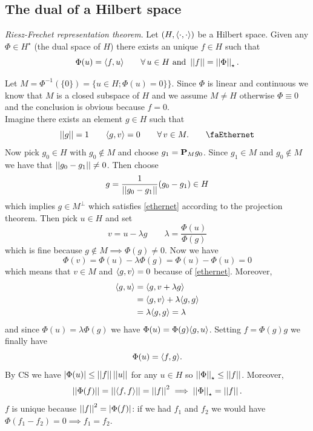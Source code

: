 \documentclass{article}
\begin{document}
\subsection{The dual of a Hilbert space}
\begin{theorem}
	\emph{Riesz-Frechet representation theorem}. Let $\left(H,\langle \cdot,\cdot \rangle\right)$ be a Hilbert space. Given any $\Phi\in H^{\star}$ (the dual space of $H$) there exists an unique $f\in H$ such that
	\begin{equation*}
		\Phi(u)=\langle f,u \rangle\qquad\forall\, u\in H\text{ and }\left|\left|f\right|\right|=\left|\left|\Phi\right|\right|_{\star}.
	\end{equation*}
\end{theorem}
\begin{fancyproof}
	Let $M=\Phi^{-1}(\{0\})=\{u\in H;\Phi(u)=0\}\}$. Since $\Phi$ is linear and continuous we know that $M$ is a closed subspace of $H$ and we assume $M\neq H$ otherwise $\Phi\equiv0$ and the conclusion is obvious because $f=0$.\\
	Imagine there exists an element $g\in H$ such that
	\begin{equation*}
		\norm{g}=1\qquad\inprod{g,v}=0\qquad\every v\in M.\tag*{\faEthernet}\label{ethernet}
	\end{equation*}
	Now pick $g_{0}\in H$ with $g_{0}\notin M$ and choose $g_{1}=\mathbf{P}_{M}g_{0}$. Since $g_{1}\in M$ and $g_{0}\notin M$ we have that $\left|\left|g_{0}-g_{1}\right|\right|\neq0$. Then choose
	\begin{equation*}
		g=\frac{1}{\left|\left|g_{0}-g_{1}\right|\right|}(g_{0}-g_{1})\in H
	\end{equation*}
which implies $g\in M^{\perp}$ which satisfies \ref{ethernet} according to the projection theorem. Then pick $u\in H$ and set
	\begin{equation*}
		v=u-\lambda g\qquad\lambda=\frac{\Phi(u)}{\Phi(g)}
	\end{equation*}
	which is fine because $g\notin M\implies \Phi(g)\neq 0$. Now we have
	\begin{equation*}
		\Phi(v)=\Phi(u)-\lambda\Phi(g)=\Phi(u)-\Phi(u)=0
	\end{equation*}
	which means that $v\in M$ and $\langle g,v \rangle=0$ because of \ref{ethernet}. Moreover,
	\begin{align*}
		\langle g,u \rangle&=\langle g,v+\lambda g \rangle\\
		&=\langle g,v \rangle+\lambda\langle g,g \rangle\\
		&=\lambda\langle g,g \rangle=\lambda
	\end{align*}
	and since $\Phi(u)=\lambda\Phi(g)$ we have $\Phi(u)=\Phi(g)\langle g,u \rangle$. Setting $f=\Phi(g)g$ we finally have
	\begin{equation*}
		\Phi(u)=\langle f,g \rangle.
	\end{equation*}
	By CS we have $|\Phi(u)|\leq\left|\left|f\right|\right|\left|\left|u\right|\right|$ for any $u\in H$ so $\left|\left|\Phi\right|\right|_{\star}\leq\left|\left|f\right|\right|$. Moreover, 
	\begin{equation*}
		\left|\left|\Phi(f)\right|\right|=\left|\left|\langle f,f \rangle\right|\right|=\left|\left|f\right|\right|^{2}\implies\left|\left|\Phi\right|\right|_{\star}=\left|\left|f\right|\right|.
	\end{equation*}
	$f$ is unique because $\left|\left|f\right|\right|^{2}=|\Phi(f)|$: if we had $f_{1}$ and $f_{2}$ we would have $\Phi(f_{1}-f_{2})=0\implies f_{1}=f_{2}$.
\end{fancyproof}
\end{document}
